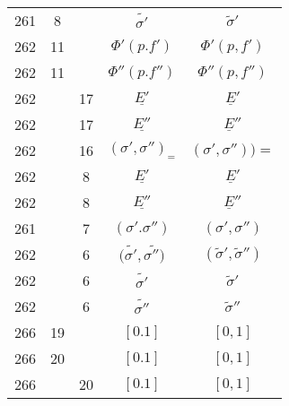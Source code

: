 \documentclass[a4paper,11pt]{article}
\begin{document}
\begin{center}
\begin{tabular}{|c|c|c|c|c|}
    261 &  8 & & $\widetilde{ \sigma' }$ & $\widetilde{ \sigma }'$ \\
    262 & 11 & & $\Phi'( p. f' )$ & $\Phi'( p, f' )$ \\
    262 & 11 & & $\Phi''( p. f'' )$ & $\Phi''( p, f'' )$ \\
    262 & & 17 & $\underline{ E' }$ & $\underline{ E }'$ \\
    262 & & 17 & $\underline{ E'' }$ & $\underline{ E }''$ \\
    262 & & 16 & $( \sigma', \sigma'' )_{ = }$
           & $( \sigma', \sigma'' ) ) =$ \\
    262 & &  8 & $\underline{ E' }$ & $\underline{ E }'$ \\
    262 & &  8 & $\underline{ E'' }$ & $\underline{ E }''$ \\
    261 & &  7 & $( \sigma'. \sigma'' )$ & $( \sigma', \sigma'' )$ \\[0.3em]
    262 & &  6 & $( \widetilde{ \sigma' }, \widetilde{ \sigma'' ) }$
           & $( \widetilde{ \sigma }', \widetilde{ \sigma }'' )$ \\[0.3em]
    262 & &  6 & $\widetilde{ \sigma' }$ & $\widetilde{ \sigma }'$ \\[0.3em]
    262 & &  6 & $\widetilde{ \sigma'' }$ & $\widetilde{ \sigma }''$ \\
    266 & 19 & & $[ 0. 1 ]$ & $[ 0, 1 ]$ \\
    266 & 20 & & $[ 0. 1 ]$ & $[ 0, 1 ]$ \\
    266 & & 20 & $[ 0. 1 ]$ & $[ 0, 1 ]$ \\
    \hline
  \end{tabular}






\end{center}
\end{document}
